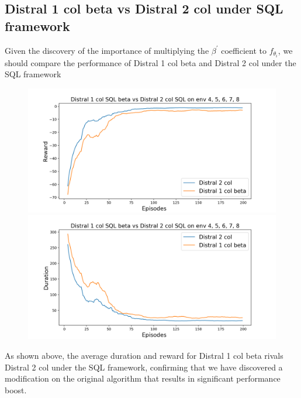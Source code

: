 \documentclass[12pt]{report}
\begin{document}
\subsection{Distral 1 col beta vs Distral 2 col under SQL framework} \label{subsec:new-algo-beta}

Given the discovery of the importance of multiplying the $\beta^\prime$ coefficient to $f_{\theta_i}$, we should compare the performance of Distral 1 col beta and Distral 2 col under the SQL framework
\begin{figure}[H]
\centering
\begin{minipage}{.5\textwidth}
\centering
\includegraphics[width=\textwidth]{figs/betas/d1_b_d2_SQL_avg_rwd.png}
\end{minipage}%
\centering
\begin{minipage}{.5\textwidth}
\centering
\includegraphics[width=\textwidth]{figs/betas/d1_b_d2_SQL_avg_dur.png}
\end{minipage}%
\end{figure}
As shown above, the average duration and reward for Distral 1 col beta rivals Distral 2 col under the SQL framework, confirming that we have discovered a modification on the original algorithm that results in significant performance boost.\\
\end{document}
